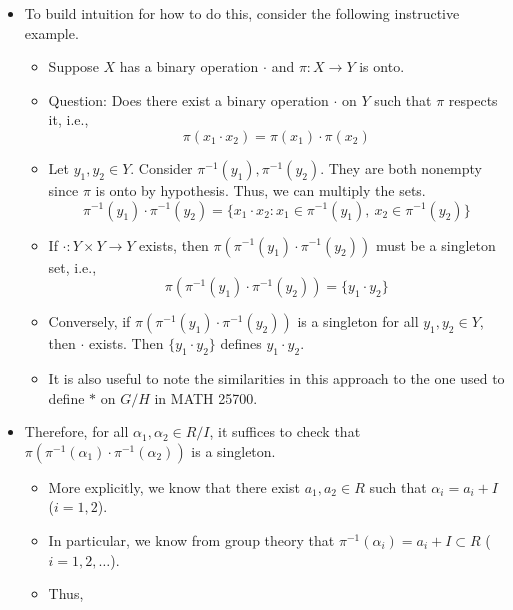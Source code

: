 \documentclass[../notes.tex]{subfiles}
\begin{document}
\begin{itemize}
\begin{itemize}
    \end{itemize}
    \item To build intuition for how to do this, consider the following instructive example.
    \begin{itemize}
        \item Suppose $X$ has a binary operation $\cdot$ and $\pi:X\to Y$ is onto.
        \item Question: Does there exist a binary operation $\cdot$ on $Y$ such that $\pi$ respects it, i.e.,
        \begin{equation*}
            \pi(x_1\cdot x_2) = \pi(x_1)\cdot\pi(x_2)
        \end{equation*}
        \item Let $y_1,y_2\in Y$. Consider $\pi^{-1}(y_1),\pi^{-1}(y_2)$. They are both nonempty since $\pi$ is onto by hypothesis. Thus, we can multiply the sets.
        \begin{equation*}
            \pi^{-1}(y_1)\cdot\pi^{-1}(y_2) = \{x_1\cdot x_2:x_1\in\pi^{-1}(y_1),\ x_2\in\pi^{-1}(y_2)\}
        \end{equation*}
        \item If $\cdot:Y\times Y\to Y$ exists, then $\pi(\pi^{-1}(y_1)\cdot\pi^{-1}(y_2))$ must be a singleton set, i.e.,
        \begin{equation*}
            \pi(\pi^{-1}(y_1)\cdot\pi^{-1}(y_2)) = \{y_1\cdot y_2\}
        \end{equation*}
        \item Conversely, if $\pi(\pi^{-1}(y_1)\cdot\pi^{-1}(y_2))$ is a singleton for all $y_1,y_2\in Y$, then $\cdot$ exists. Then $\{y_1\cdot y_2\}$ defines $y_1\cdot y_2$.
        \item It is also useful to note the similarities in this approach to the one used to define $*$ on $G/H$ in MATH 25700.
    \end{itemize}
    \item Therefore, for all $\alpha_1,\alpha_2\in R/I$, it suffices to check that $\pi(\pi^{-1}(\alpha_1)\cdot\pi^{-1}(\alpha_2))$ is a singleton.
    \begin{itemize}
        \item More explicitly, we know that there exist $a_1,a_2\in R$ such that $\alpha_i=a_i+I$ ($i=1,2$).
        \item In particular, we know from group theory that $\pi^{-1}(\alpha_i)=a_i+I\subset R$ ($i=1,2,\dots$).
        \item Thus,
        \begin{align*}

\end{align*}
\end{itemize}
\end{itemize}
\end{document}
